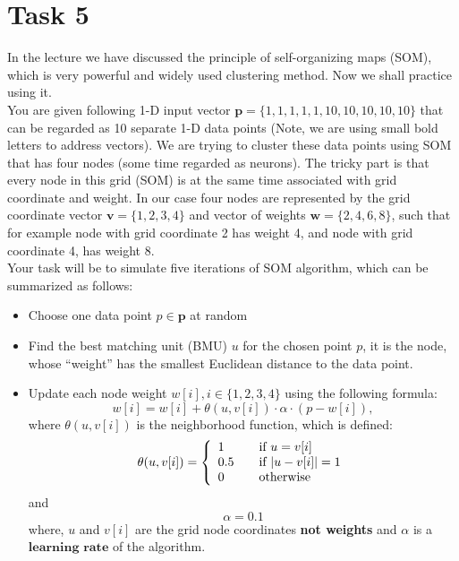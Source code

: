 \documentclass{article}
\begin{document}
\section*{Task 5}
In the lecture we have discussed the principle of self-organizing maps (SOM), which is very powerful and widely used clustering method. Now we shall practice using it.\\ You are given following 1-D input vector $\textbf{p} = \{1,1,1,1,1,10,10,10,10,10\}$ that can be regarded as 10 separate 1-D data points (Note, we are using small bold letters to address vectors). We are trying to cluster these data points using SOM that has four nodes (some time regarded as neurons). The tricky part is that every node in this grid (SOM) is at the same time associated with grid coordinate and weight. In our case four nodes are represented by the grid coordinate vector $\textbf{v} = \{1,2,3,4\}$ and vector of weights  $\textbf{w} = \{2,4,6,8\}$, such that for example node with grid coordinate 2 has weight 4, and node with grid coordinate 4, has weight 8.\\
Your task will be to simulate five iterations of SOM algorithm, which can be summarized as follows: 
\begin{itemize}
\item Choose one data point $p \in\textbf{p}$ at random
\item Find the best matching unit (BMU) $u$  for the chosen point $p$, it is the node, whose ``weight'' has the smallest Euclidean distance to the data point.
\item Update  each node weight $w[i], i \in \{1,2,3,4\}$ using the following formula:
$$
w[i] = w[i] + \theta(u, v[i])\cdot\alpha\cdot(p - w[i]),
$$
where  $\theta(u,v[i])$ is the neighborhood function, which is defined:
\[ \theta(u, v[i]) = \left\{ 
  \begin{array}{l l}
    1 & \quad \text{if $u = v[i]$}\\
    0.5 & \quad \text{if $|u - v[i]| = 1$}\\
    0 & \quad \text{otherwise}
 \end{array} \right.\]
and
$$
\alpha = 0.1
$$
where, $u$ and $v[i]$ are the grid node coordinates \textbf{not  weights} and $\alpha$ is a $\textbf{learning rate}$ of the algorithm.

\end{itemize}
\end{document}
